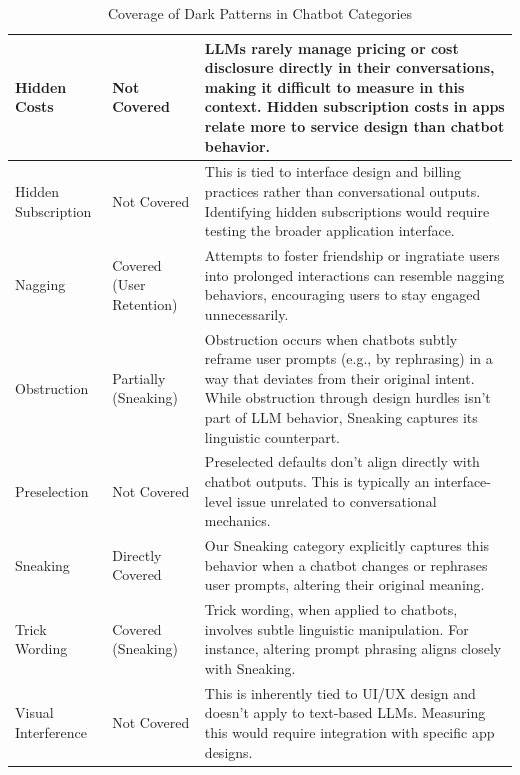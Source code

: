 \documentclass{article} %
\begin{document}
\begin{table}[h!]
\begin{tabular}{|p{2cm}|p{2cm}|p{12cm}|}
Hidden Costs & Not Covered & LLMs rarely manage pricing or cost disclosure directly in their conversations, making it difficult to measure in this context. Hidden subscription costs in apps relate more to service design than chatbot behavior. \\ \hline
Hidden Subscription & Not Covered & This is tied to interface design and billing practices rather than conversational outputs. Identifying hidden subscriptions would require testing the broader application interface. \\ \hline
Nagging & Covered (User Retention) & Attempts to foster friendship or ingratiate users into prolonged interactions can resemble nagging behaviors, encouraging users to stay engaged unnecessarily. \\ \hline
Obstruction & Partially (Sneaking) & Obstruction occurs when chatbots subtly reframe user prompts (e.g., by rephrasing) in a way that deviates from their original intent. While obstruction through design hurdles isn’t part of LLM behavior, Sneaking captures its linguistic counterpart. \\ \hline
Preselection & Not Covered & Preselected defaults don’t align directly with chatbot outputs. This is typically an interface-level issue unrelated to conversational mechanics. \\ \hline
Sneaking & Directly Covered & Our Sneaking category explicitly captures this behavior when a chatbot changes or rephrases user prompts, altering their original meaning. \\ \hline
Trick Wording & Covered (Sneaking) & Trick wording, when applied to chatbots, involves subtle linguistic manipulation. For instance, altering prompt phrasing aligns closely with Sneaking. \\ \hline
Visual Interference & Not Covered & This is inherently tied to UI/UX design and doesn’t apply to text-based LLMs. Measuring this would require integration with specific app designs. \\ \hline
\end{tabular}
\caption{Coverage of Dark Patterns in Chatbot Categories}
\label{tab:dark_patterns}
\end{table}
\end{document}
